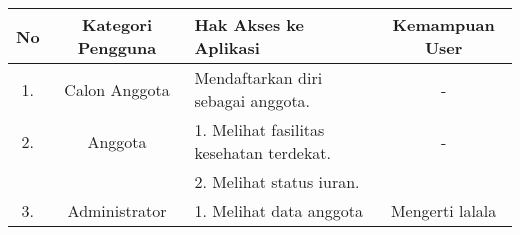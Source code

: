 \begin{table}[h]
		\centering
		\begin{tabular}{c | c | l | c}
			\hline
			No	& Kategori Pengguna	& Hak Akses ke Aplikasi 						& Kemampuan User\\
			\hline
			1.	& Calon Anggota		& Mendaftarkan diri sebagai anggota.			& -\\
			\hline
			2.	& Anggota			& 1. Melihat fasilitas kesehatan terdekat.		& -\\
				&					& 2. Melihat status iuran.						& \\
			\hline
			3. 	& Administrator		& 1. Melihat data anggota						& Mengerti lalala \\
		\end{tabular}
	\end{table}